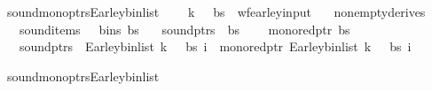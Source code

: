 \begin{isabellebody}
%
\isadelimproof
%
\endisadelimproof
%
\begin{isamarkuptext}%
%
\end{isamarkuptext}\isamarkuptrue%
\isamarkupfalse%
\ sound{\isacharunderscore}{\kern0pt}mono{\isacharunderscore}{\kern0pt}ptrs{\isacharunderscore}{\kern0pt}Earley{\isacharunderscore}{\kern0pt}bin{\isacharunderscore}{\kern0pt}list{\isacharprime}{\kern0pt}{\isacharcolon}{\kern0pt}\ %
\isanewline
\ \ \ {\isachardoublequoteopen}{\isacharparenleft}{\kern0pt}k{\isacharcomma}{\kern0pt}\ {\isasymG}{\isacharcomma}{\kern0pt}\ {\isasymomega}{\isacharcomma}{\kern0pt}\ bs{\isacharparenright}{\kern0pt}\ {\isasymin}\ wf{\isacharunderscore}{\kern0pt}earley{\isacharunderscore}{\kern0pt}input{\isachardoublequoteclose}\isanewline
\ \ \ {\isachardoublequoteopen}nonempty{\isacharunderscore}{\kern0pt}derives\ {\isasymG}{\isachardoublequoteclose}\isanewline
\ \ \ {\isachardoublequoteopen}sound{\isacharunderscore}{\kern0pt}items\ {\isasymG}\ {\isasymomega}\ {\isacharparenleft}{\kern0pt}bins\ bs{\isacharparenright}{\kern0pt}{\isachardoublequoteclose}\isanewline
\ \ \ {\isachardoublequoteopen}sound{\isacharunderscore}{\kern0pt}ptrs\ {\isasymomega}\ bs{\isachardoublequoteclose}\ \isanewline
\ \ \ {\isachardoublequoteopen}mono{\isacharunderscore}{\kern0pt}red{\isacharunderscore}{\kern0pt}ptr\ bs{\isachardoublequoteclose}\isanewline
\ \ \ {\isachardoublequoteopen}sound{\isacharunderscore}{\kern0pt}ptrs\ {\isasymomega}\ {\isacharparenleft}{\kern0pt}Earley{\isacharunderscore}{\kern0pt}bin{\isacharunderscore}{\kern0pt}list{\isacharprime}{\kern0pt}\ k\ {\isasymG}\ {\isasymomega}\ bs\ i{\isacharparenright}{\kern0pt}\ {\isasymand}\ mono{\isacharunderscore}{\kern0pt}red{\isacharunderscore}{\kern0pt}ptr\ {\isacharparenleft}{\kern0pt}Earley{\isacharunderscore}{\kern0pt}bin{\isacharunderscore}{\kern0pt}list{\isacharprime}{\kern0pt}\ k\ {\isasymG}\ {\isasymomega}\ bs\ i{\isacharparenright}{\kern0pt}{\isachardoublequoteclose}%
\isadelimproof
%
\endisadelimproof
%
\isatagproof
%
\endisatagproof
{\isafoldproof}%
%
\isadelimproof
%
\endisadelimproof
%
\begin{isamarkuptext}%
%
\end{isamarkuptext}\isamarkuptrue%
\isamarkupfalse%
\ sound{\isacharunderscore}{\kern0pt}mono{\isacharunderscore}{\kern0pt}ptrs{\isacharunderscore}{\kern0pt}Earley{\isacharunderscore}{\kern0pt}bin{\isacharunderscore}{\kern0pt}list{\isacharcolon}{\kern0pt}\isanewline

\end{isabellebody}
